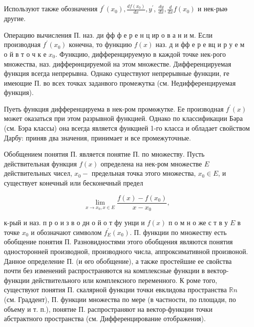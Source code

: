 \documentclass[10pt]{article}
\begin{document}
Используют также обозначения $f^{\prime}\left(x_{0}\right), \frac{d f\left(x_{0}\right)}{d x}, y^{\prime}$, $\frac{d y}{d x}, \frac{d}{d x} f\left(x_{0}\right)$ и нек-рыө другие.



Операцию вычисления П. наз. ди фф ф е р е н ц ир о в а н и м. Если производная $f^{\prime}\left(x_{0}\right)$ конечна, то функцию $f(x)$ наз. д и фф е р е вц и р у е м о й в т $о$ ч к е $x_{0}$. Функцию, дифференцируемую в каждой точке нек-рого множества, наз. дифферөнцируемой на этом множестве. Дифференцируемая функция всегда непрерывна. Однако существуют непрерывные функции, ғе имеющие П. во всех точках заданвого промежутка (см. Недифференцируемая функция).



Пуеть функция дифференцируема в нек-ром промөжутке. Ее производная $f^{\prime}(x)$ может оказаться при этом разрывной функцией. Однако по классификации Бәра (см. Бэра классы) она всегда является функцией 1-го класса и обладает свойством Дарбу: приняв два значения, принимает и все промежуточные.



Обобщением понятия П. является понятие П. по множеству. Пусть действительная функция $f(x)$ определена на нек-ром множестве $E$ действительных чисел, $x_{0}-$ предельная точка этого множества, $x_{0} \in E$, и существует конечный или бесконечный предел



\[

\lim _{x \rightarrow x_{0}, x \in E} \frac{f(x)-f\left(x_{0}\right)}{x-x_{0}},

\]



к-рый и наз. п р о и з в о дн о й о т фу унци и $f(x)$ п о м н о же с т в у $E$ в точке $x_{0}$ и обозначают символом $f_{E}^{\prime}\left(x_{0}\right)$. П. функции по множеству есть обобщение понятия П. Разновидностями этого обобщения являются понятия односторонней производной, производного числа, аппроксимативной произвоной. Данное определение П. (и өго обобщение), а также простейшие ее свойства почти без изменений распространяются на комплексные функции в вектор-функции действительного или комплексного переменного. К роме того, существуют понятия П. скалярной функции точки евклидова пространства $\mathbb{R} n$ (см. Граддент), П. функции множества по мере (в частности, по площади, по объему и т. п.), понятие П. распространяют на вектор-функции точки абстрактного пространства (см. Дифференцирование отображения).
\end{document}
